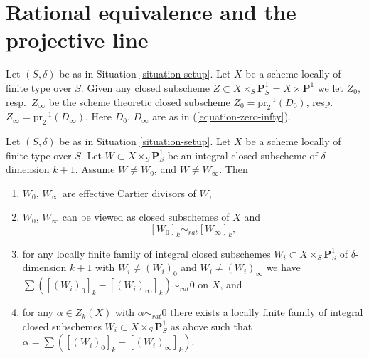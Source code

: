 














\section{Rational equivalence and the projective line}
\label{section-different-rational-equivalence}

\noindent
Let $(S, \delta)$ be as in Situation \ref{situation-setup}.
Let $X$ be a scheme locally of finite type over $S$.
Given any closed subscheme
$Z \subset X \times_S \mathbf{P}^1_S = X \times \mathbf{P}^1$
we let $Z_0$, resp.\ $Z_\infty$ be the scheme theoretic closed
subscheme $Z_0 = \text{pr}_2^{-1}(D_0)$,
resp.\ $Z_\infty = \text{pr}_2^{-1}(D_\infty)$.
Here $D_0$, $D_\infty$ are as in (\ref{equation-zero-infty}).

\begin{lemma}
\label{lemma-rational-equivalence-family}
Let $(S, \delta)$ be as in Situation \ref{situation-setup}.
Let $X$ be a scheme locally of finite type over $S$.
Let $W \subset X \times_S \mathbf{P}^1_S$ be an integral
closed subscheme of $\delta$-dimension $k + 1$.
Assume $W \not = W_0$, and $W \not = W_\infty$. Then
\begin{enumerate}
\item $W_0$, $W_\infty$ are effective Cartier divisors of $W$,
\item $W_0$, $W_\infty$ can be viewed as closed subschemes
of $X$ and
$$
[W_0]_k \sim_{rat} [W_\infty]_k,
$$
\item for any locally finite family of
integral closed subschemes
$W_i \subset X \times_S \mathbf{P}^1_S$
of $\delta$-dimension $k + 1$ with $W_i \not = (W_i)_0$ and
$W_i \not = (W_i)_\infty$ we have
$\sum ([(W_i)_0]_k - [(W_i)_\infty]_k) \sim_{rat} 0$
on $X$, and
\item for any $\alpha \in Z_k(X)$ with $\alpha \sim_{rat} 0$
there exists a locally finite family of
integral closed subschemes $W_i \subset X \times_S \mathbf{P}^1_S$
as above such that $\alpha = \sum ([(W_i)_0]_k - [(W_i)_\infty]_k)$.
\end{enumerate}
\end{lemma}

